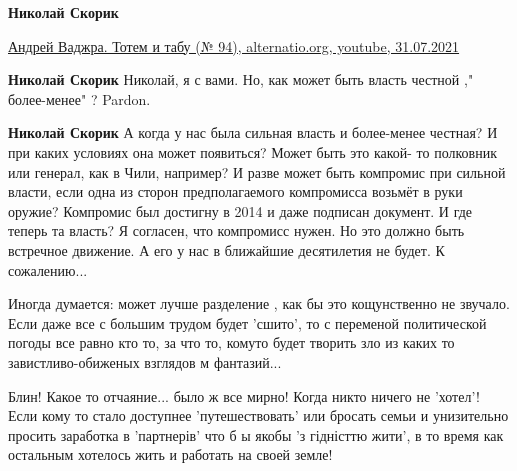 \begin{itemize}
\begin{itemize}
\textbf{Николай Скорик}

\href{https://www.youtube.com/watch?v=DCLwhq-SkMc}{%
Андрей Ваджра. Тотем и табу (№ 94), alternatio.org, youtube, 31.07.2021%
}

 
\textbf{Николай Скорик} Николай, я с вами.
Но, как может быть власть честной ," более-менее" ?
Pardon.

 
\textbf{Николай Скорик} А когда у нас была сильная власть и более-менее
честная? И при каких условиях она может появиться? Может быть это какой- то
полковник или генерал, как в Чили, например? И разве может быть компромис при
сильной власти, если одна из сторон предполагаемого компромисса возьмёт в руки
оружие? Компромис был достигну в 2014 и даже подписан документ. И где теперь та
власть? Я согласен, что компромисс нужен. Но это должно быть встречное движение. А
его у нас в ближайшие десятилетия не будет. К сожалению...

 

Иногда думается: может лучше разделение , как бы это кощунственно не звучало.
Если даже все с большим трудом будет 'сшито', то с переменой политической
погоды все равно кто то, за что то, комуто будет творить зло из каких то
завистливо-обиженых взглядов м фантазий...

Блин! Какое то отчаяние... было ж все мирно! Когда никто ничего не 'хотел'!
Если кому то стало доступнее 'путешествовать' или бросать семьи и унизительно
просить заработка в 'партнерів' что б ы якобы 'з гідністтю жити', в то время
как остальным хотелось жить и работать на своей земле!


 

\end{itemize}
\end{itemize}
